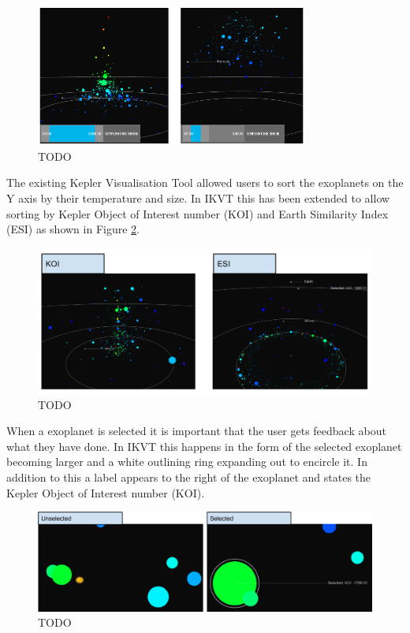 \begin{figure}[H]
  \centering
      \includegraphics[width=0.8\textwidth]{images/zoomFilter.png}
  \caption{TODO~}  
    \label{fig:zoomFilter}
\end{figure}

The existing Kepler Visualisation Tool allowed users to sort the exoplanets on
the Y axis by their temperature and size. In IKVT this has been extended to
allow sorting by Kepler Object of Interest number (KOI) and Earth Similarity
Index (ESI) as shown in Figure \ref{fig:ESIKOI}.


\begin{figure}[H]
  \centering
      \includegraphics[width=1\textwidth]{images/ESIKOI.pdf}
  \caption{TODO~}  
    \label{fig:ESIKOI}
\end{figure}

When a exoplanet is selected it is important that the user gets feedback about
what they have done. In IKVT this happens in the form of the selected exoplanet
becoming larger and a white outlining ring expanding out to encircle it. In
addition to this a label appears to the right of the exoplanet and states the
Kepler Object of Interest number (KOI). 

\begin{figure}[H]
  \centering
      \includegraphics[width=1\textwidth]{images/selectedPlanet.jpg}
  \caption{TODO~}  
    \label{fig:selectedPlanet}
\end{figure}

